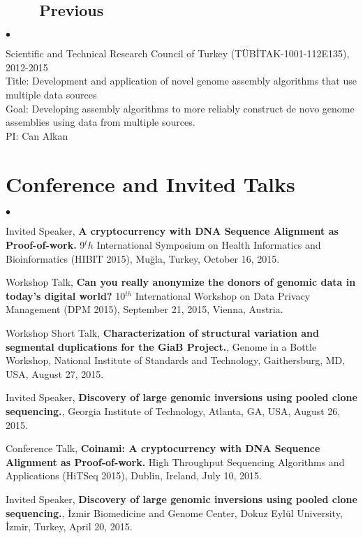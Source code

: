 \documentclass[margin,line]{res}
\newenvironment{list2}{
  \begin{list}{$\bullet$}{%
      \setlength{\itemsep}{0in}
      \setlength{\parsep}{0in} \setlength{\parskip}{0in}
      \setlength{\topsep}{0in} \setlength{\partopsep}{0in} 
      \setlength{\leftmargin}{0.2in}}}{\end{list}}
\begin{document}
\begin{resume}
\vspace{-0.5cm}
                                       \subsection{\small \sc ~~~~Previous}

                                       \begin{list2}
                                       \item
                                         Scientific and Technical Research Council of Turkey (T\"{U}B\.{I}TAK-1001-112E135), 2012-2015\\
                                         Title: Development and application of novel genome assembly algorithms that use multiple data sources\\
                                         Goal: Developing assembly algorithms to more reliably construct de novo genome assemblies using data from multiple sources.\\
                                         PI: Can Alkan
                                       \end{list2}


\vspace*{-.2cm}
\section{\sc Conference and Invited Talks}

\begin{list2}
\item
  Invited Speaker,
  {\bf A cryptocurrency with DNA Sequence Alignment as Proof-of-work.}
  9$^th$ International Symposium on Health Informatics and Bioinformatics (HIBIT 2015),
   Muğla, Turkey, October 16, 2015.
\item
  Workshop Talk, 
  {\bf Can you really anonymize the donors of genomic data in today's digital world?}
  10$^{th}$ International Workshop on Data Privacy Management (DPM 2015), 
  September 21, 2015, Vienna, Austria.
\item
  Workshop Short Talk, 
  {\bf Characterization of structural variation and segmental duplications for the GiaB Project.},
  Genome in a Bottle Workshop, National Institute of Standards and Technology, Gaithersburg, MD, USA,
  August 27, 2015.
\item
  Invited Speaker, 
  {\bf Discovery of large genomic inversions using pooled clone sequencing.},
  Georgia Institute of Technology, Atlanta, GA, USA, August 26, 2015.
\item
  Conference Talk, 
  {\bf Coinami: A cryptocurrency with DNA Sequence Alignment as Proof-of-work.}
  High Throughput Sequencing Algorithms and Applications (HiTSeq 2015), Dublin, Ireland, July 10, 2015.
\item
  Invited Speaker, 
  {\bf Discovery of large genomic inversions using pooled clone sequencing.},
  İzmir Biomedicine and Genome Center, Dokuz Eylül University, İzmir, Turkey, April 20, 2015.


\end{list2}
\end{resume}
\end{document}
